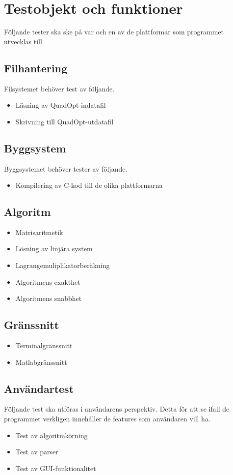 \section{Testobjekt och funktioner}
Följande tester ska ske på var och en av de plattformar som programmet utvecklas till.
\subsection{Filhantering}
Filsystemet behöver test av följande.
\begin{itemize}
	\item{Läsning av QuadOpt-indatafil}
	\item{Skrivning till QuadOpt-utdatafil}
\end{itemize}

\subsection{Byggsystem}
Byggsystemet behöver tester av följande.
\begin{itemize}
	\item{Kompilering av C-kod till de olika plattformarna}
\end{itemize}

\subsection{Algoritm}
\begin{itemize}
	\item{Matrisaritmetik}
	\item{Lösning av linjära system}
	\item{Lagrangemuliplikatorberäkning}
	\item{Algoritmens exakthet}
	\item{Algoritmens snabbhet}
\end{itemize}

\subsection{Gränssnitt}
\begin{itemize}
	\item{Terminalgränssnitt}
	\item{Matlabgränssnitt}
\end{itemize}


\subsection{Användartest}
Följande test ska utföras i användarens perspektiv. Detta för att se ifall de programmet verkligen innehåller de features som användaren vill ha.

\begin{itemize}
\item{Test av algoritmkörning}
\item{Test av parser}
\item{Test av GUI-funktionalitet}
\end{itemize}